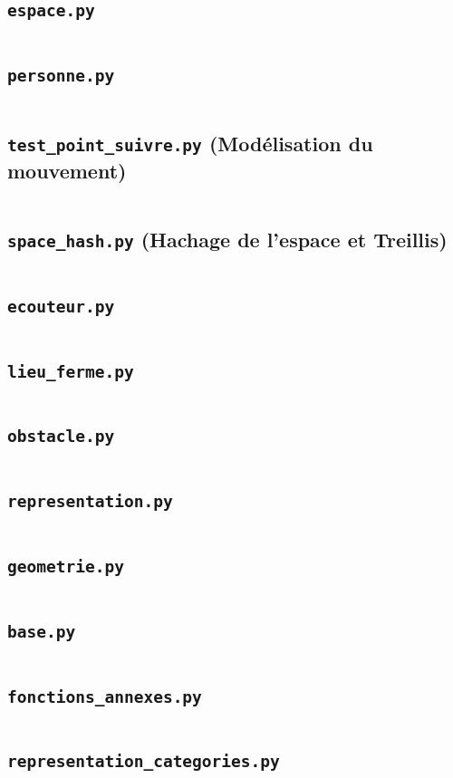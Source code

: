 \documentclass{article}
\newcommand{\filename}[1]{\texttt{#1}}
\begin{document}
\subsection{\filename{espace.py}}
\inputminted{python}{lst/espace.py}
\subsection{\filename{personne.py}}
\inputminted{python}{lst/personne.py}
\subsection{\filename{test\_point\_suivre.py} (Modélisation du mouvement)}
\inputminted{python}{lst/test_point_suivre.py}
\subsection{\filename{space\_hash.py} (Hachage de l'espace et Treillis)}
\inputminted{python}{lst/space_hash.py}
\subsection{\filename{ecouteur.py}}
\inputminted{python}{lst/ecouteur.py}
\subsection{\filename{lieu\_ferme.py}}
\inputminted{python}{lst/lieu_ferme.py}
\subsection{\filename{obstacle.py}}
\inputminted{python}{lst/obstacle.py}
\subsection{\filename{representation.py}}
\inputminted{python}{lst/representation.py}
\subsection{\filename{geometrie.py}}
\inputminted{python}{lst/geometrie.py}
\subsection{\filename{base.py}}
\inputminted{python}{lst/base.py}
\subsection{\filename{fonctions\_annexes.py}}
\inputminted{python}{lst/fonctions_annexes.py}
\subsection{\filename{representation\_categories.py}}
\inputminted{python}{lst/representation_categories.py}
\end{document}
